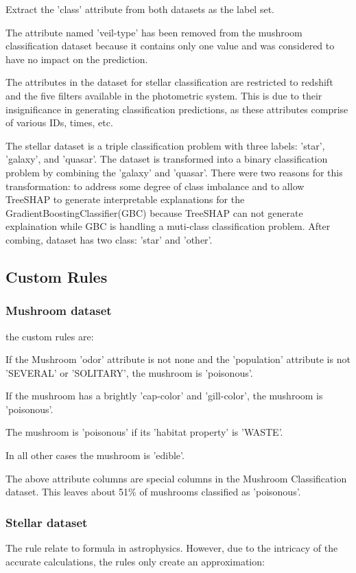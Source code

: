 \documentclass[runningheads,a4paper]{llncs}
\begin{document}
Extract the 'class' attribute from both datasets as the label set.

The attribute named 'veil-type' has been removed from the mushroom  classification dataset because it contains only one value and was considered to have no impact on the prediction.

The attributes in the dataset for stellar classification are restricted to redshift and the five filters available in the photometric system. This is due to their insignificance in generating classification predictions, as these attributes comprise of various IDs, times, etc.

The stellar dataset is a triple classification problem with three labels: 'star', 'galaxy', and 'quasar'. 
The dataset is transformed into a binary classification problem by combining the 'galaxy' and 'quasar'. 
There were two reasons for this transformation: to address some degree of class imbalance and to allow TreeSHAP to generate interpretable explanations for the GradientBoostingClassifier(GBC) because TreeSHAP can not generate explaination while GBC is  handling a muti-class classification problem.
After combing, dataset has two class: 'star' and 'other'.
\subsection{Custom Rules}
\subsubsection{Mushroom dataset} 

the custom rules are:

If the Mushroom 'odor' attribute is not none and the 'population' attribute is not 'SEVERAL' or 'SOLITARY', the mushroom is 'poisonous'.

If the mushroom has a brightly 'cap-color' and 'gill-color', the mushroom is 'poisonous'.

The mushroom is 'poisonous' if its 'habitat property' is 'WASTE'.

In all other cases the mushroom is 'edible'.

The above attribute columns are special columns in the Mushroom Classification dataset.
This leaves about 51\% of mushrooms classified as 'poisonous'.
\subsubsection{Stellar dataset}
The rule relate to formula in astrophysics\cite{ryden2020foundations}. However, due to the intricacy of the accurate calculations, the rules only create an approximation:
\end{document}
